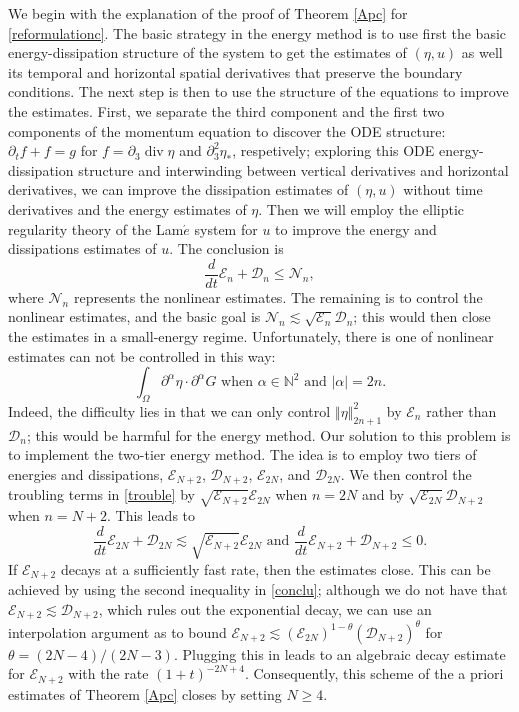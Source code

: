 \documentclass[a4paper,reqno,11pt]{amsart}
\numberwithin{equation}{section}
\providecommand{\norm}[1]{\left\Vert#1\right\Vert}
\providecommand{\sd}[1]{\mathcal{D}_{#1}}
\providecommand{\se}[1]{\mathcal{E}_{#1}}
\providecommand{\norm}[1]{\left\Vert#1\right\Vert}
\begin{document}
We begin with the explanation of the proof of Theorem \ref{Apc} for \eqref{reformulationc}. The basic strategy in the energy method is to use first the basic energy-dissipation structure of the system to get the estimates of $(\eta,u)$ as well its temporal and horizontal spatial derivatives that preserve the boundary conditions. The next step is then to use the structure of the equations to improve the estimates. First, we separate the third component and the first two components of the momentum equation to discover the ODE structure: ${\partial_t} f+f=g$ for $f={\partial}_3 \operatorname{div}\eta$ and ${\partial}_3^2 \eta_\ast$, respetively; exploring this ODE energy-dissipation structure and interwinding between vertical derivatives and horizontal derivatives, we can improve the dissipation estimates of $(\eta,u)$ without time derivatives and the energy estimates of $\eta$. Then we will employ the elliptic regularity theory of the Lam$\acute{e}$ system for $u$ to improve the energy and dissipations estimates of $ u$. The conclusion is
\begin{equation}
{ \frac{d}{dt}} \se{n}+\sd{n}\le \mathcal{N}_n,
\end{equation}
where $\mathcal{N}_n$ represents the nonlinear estimates. The remaining is to control the nonlinear estimates, and the basic goal is $\mathcal{N}_n{\lesssim} \sqrt{\se{n}}\sd{n}$; this would then close the estimates in a small-energy regime. Unfortunately, there is one of nonlinear estimates can not be controlled in this way:
\begin{equation}\label{trouble}
\int_\Omega   {\partial}^{\alpha} \eta \cdot  {\partial}^{\alpha} G \text{ when }\alpha\in \mathbb{N}^2 \text{ and }|\alpha|=2n.
\end{equation}
Indeed, the difficulty lies in that we can only control $\norm{ \eta }_{2n+1}^2$ by $\se{n}$ rather than $\sd{n}$; this would be harmful for the energy method. Our solution to this problem is to implement the two-tier energy method.  The idea is to employ two tiers of energies and dissipations, $\se{N+2}$, $\sd{N+2}$, $\se{2N}$, and $\sd{2N}$.  We then control the troubling terms in \eqref{trouble} by $\sqrt{\se{N+2}}\se{2N}$ when $n=2N$ and by $\sqrt{\se{2N}}\sd{N+2}$ when $n=N+2$. This leads to
\begin{equation}\label{conclu}
 \frac{d}{dt} \se{2N} + \sd{2N} {\lesssim}  \sqrt{\se{N+2}}\se{2N} \text{ and } \frac{d}{dt} \se{N+2} + \sd{N+2} \le 0.
\end{equation}
If $\se{N+2}$ decays at a sufficiently fast rate, then the estimates close. This can be achieved by using the second inequality in \eqref{conclu};
although we do not have that $  \se{N+2}{\lesssim} \sd{N+2}$, which rules out the exponential decay, we can use an interpolation argument as \cite{RG,GT_per} to bound $\se{N+2} {\lesssim} (\se{2N})^{1-\theta} (\sd{N+2})^{\theta}$ for $\theta=(2N-4)/(2N-3)$.  Plugging this in leads to an algebraic decay estimate for $\se{N+2}$ with the rate $(1+t)^{-2N+4}$. Consequently, this scheme of the a priori estimates of Theorem \ref{Apc} closes by setting $N\ge 4$.
\end{document}
